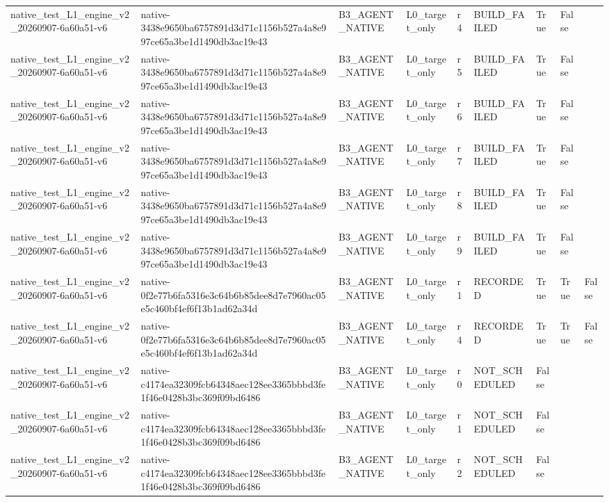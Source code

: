 \begin{tabular}{lllllllll}
native\_test\_L1\_engine\_v2\_20260907-6a60a51-v6 & native-3438e9650ba6757891d3d71c1156b527a4a8e997ce65a3be1d1490db3ac19e43 & B3\_AGENT\_NATIVE & L0\_target\_only & r4 & BUILD\_FAILED & True & False &  \\
native\_test\_L1\_engine\_v2\_20260907-6a60a51-v6 & native-3438e9650ba6757891d3d71c1156b527a4a8e997ce65a3be1d1490db3ac19e43 & B3\_AGENT\_NATIVE & L0\_target\_only & r5 & BUILD\_FAILED & True & False &  \\
native\_test\_L1\_engine\_v2\_20260907-6a60a51-v6 & native-3438e9650ba6757891d3d71c1156b527a4a8e997ce65a3be1d1490db3ac19e43 & B3\_AGENT\_NATIVE & L0\_target\_only & r6 & BUILD\_FAILED & True & False &  \\
native\_test\_L1\_engine\_v2\_20260907-6a60a51-v6 & native-3438e9650ba6757891d3d71c1156b527a4a8e997ce65a3be1d1490db3ac19e43 & B3\_AGENT\_NATIVE & L0\_target\_only & r7 & BUILD\_FAILED & True & False &  \\
native\_test\_L1\_engine\_v2\_20260907-6a60a51-v6 & native-3438e9650ba6757891d3d71c1156b527a4a8e997ce65a3be1d1490db3ac19e43 & B3\_AGENT\_NATIVE & L0\_target\_only & r8 & BUILD\_FAILED & True & False &  \\
native\_test\_L1\_engine\_v2\_20260907-6a60a51-v6 & native-3438e9650ba6757891d3d71c1156b527a4a8e997ce65a3be1d1490db3ac19e43 & B3\_AGENT\_NATIVE & L0\_target\_only & r9 & BUILD\_FAILED & True & False &  \\
native\_test\_L1\_engine\_v2\_20260907-6a60a51-v6 & native-0f2e77b6fa5316e3c64b6b85dee8d7e7960ac05e5c460bf4ef6f13b1ad62a34d & B3\_AGENT\_NATIVE & L0\_target\_only & r1 & RECORDED & True & True & False \\
native\_test\_L1\_engine\_v2\_20260907-6a60a51-v6 & native-0f2e77b6fa5316e3c64b6b85dee8d7e7960ac05e5c460bf4ef6f13b1ad62a34d & B3\_AGENT\_NATIVE & L0\_target\_only & r4 & RECORDED & True & True & False \\
native\_test\_L1\_engine\_v2\_20260907-6a60a51-v6 & native-c4174ea32309fcb64348aec128ee3365bbbd3fe1f46e0428b3bc369f09bd6486 & B3\_AGENT\_NATIVE & L0\_target\_only & r0 & NOT\_SCHEDULED & False &  &  \\
native\_test\_L1\_engine\_v2\_20260907-6a60a51-v6 & native-c4174ea32309fcb64348aec128ee3365bbbd3fe1f46e0428b3bc369f09bd6486 & B3\_AGENT\_NATIVE & L0\_target\_only & r1 & NOT\_SCHEDULED & False &  &  \\
native\_test\_L1\_engine\_v2\_20260907-6a60a51-v6 & native-c4174ea32309fcb64348aec128ee3365bbbd3fe1f46e0428b3bc369f09bd6486 & B3\_AGENT\_NATIVE & L0\_target\_only & r2 & NOT\_SCHEDULED & False &  &  \\

\end{tabular}
